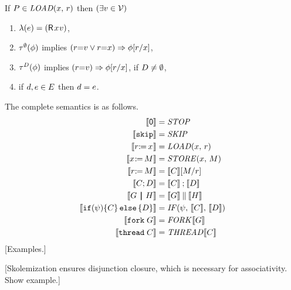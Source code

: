 \begin{definition}
  \noindent
  If $\aPS\SB0 \in \sLOAD{\aLoc}{\aReg}$ then
  $(\exists\aVal\in\Val)$
  \begin{enumerate}
  \item $\labelingAct\SB0(\aEv) = \DRP{\aLoc}{\aVal}$,
  \item %
    $\aTr[\emptyset]\SB0(\aForm)$ implies $(\aReg{=}\aVal\lor\aReg{=}\aLoc)\limplies\aForm[\aReg/\aLoc]$,
  \item %
    $\aTr[\bEvs]\SB0(\aForm)$ implies $(\aReg{=}\aVal)\limplies\aForm[\aReg/\aLoc]$, if $\bEvs\neq\emptyset$,
  \item if $\bEv,\aEv\in\aEvs\SB0$ then $\bEv=\aEv$.
  \end{enumerate}

\end{definition}
The complete semantics is as follows.
\begin{align*}
  \sem{\NIL} &= \sSTOP
  \\
  \sem{\SKIP} &= \sSKIP
  \\
  \sem{\PR{\aLoc}{\aReg}} &= \sLOAD{\aLoc}{\aReg}
  \\
  \sem{\PW{\aLoc}{\aExp}} &= \sSTORE{\aLoc}{\aExp}
  \\
  \sem{\LET{\aReg}{\aExp}} &= \sem{\aCmd}[\aExp/\aReg]
  \\
  \sem{\aCmd \SEMI \bCmd} &= \sem{\aCmd}\sSEMI\sem{\bCmd}
  \\
  \sem{\aGrp \PAR \bGrp} &= \sem{\aGrp}\sPAR\sem{\bGrp}
  \\
  \sem{\IF{\bForm}\THEN\aCmd\ELSE\bCmd\FI} &= \sIF{\bForm}\sTHEN\sem{\aCmd}\sELSE\sem{\bCmd}\sFI
  \\
  \sem{\FORK{\aGrp}} &= \sFORK{}\sem{\aGrp}
  \\
  \sem{\THREAD{\aCmd}} &= \sTHREAD{}\sem{\aCmd}
\end{align*}
[Examples.]


[Skolemization ensures disjunction closure, which is necessary
for associativity. Show example.]

